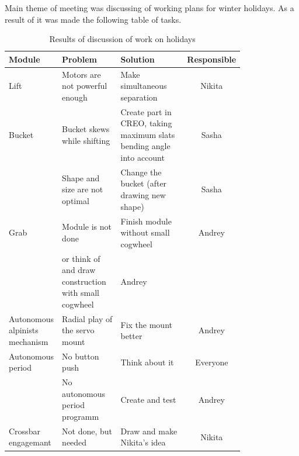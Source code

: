 Main theme of meeting was discussing of working plans for winter holidays. As a result of it was made the following table of tasks.
\begin{table}[H]
	\caption{Results of discussion of work on holidays}
	\label{tabular:meetingSPB10.01}
	\begin{center}
		\begin{tabular}{|p{0.12\linewidth}|p{0.3\linewidth}|p{0.38\linewidth}|c|}
		  \hline 
		  \textbf{Module} & \textbf{Problem} & \textbf{Solution} & \textbf{Responsible} \\
		  \hline 
		  Lift	& Motors are not powerful enough & Make simultaneous separation &	Nikita \\
		  \hline
		  Bucket & Bucket skews while shifting & Create part in CREO, taking maximum slats bending angle into account & Sasha \\
		   & Shape and size are not optimal & Change the bucket (after drawing new shape) &	Sasha \\
		  \hline
		  Grab	& Module is not done & Finish module without small cogwheel	& Andrey \\
		  & or think of and draw construction with small cogwheel	& Andrey \\
		  \hline
		  Autonomous alpinists mechanism & Radial play of the servo mount & Fix the mount better & Andrey \\
		  \hline
		  Autonomous period & No button push & Think about it & Everyone\\
		  & No autonomous period programm	& Create and test & Andrey\\	
		  \hline
		  Crossbar engagemant & Not done, but needed & Draw and make Nikita's idea & Nikita \\
		  \hline
		\end{tabular}
	\end{center}
\end{table}
